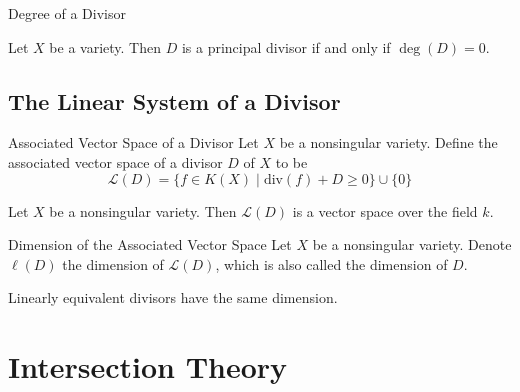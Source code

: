 \documentclass[a4paper]{article}
\begin{document}
\begin{defn}{Degree of a Divisor}{}
\end{defn}

\begin{prp}{}{} Let $X$ be a variety. Then $D$ is a principal divisor if and only if $\deg(D)=0$. 
\end{prp}

\subsection{The Linear System of a Divisor}
\begin{defn}{Associated Vector Space of a Divisor}{} Let $X$ be a nonsingular variety. Define the associated vector space of a divisor $D$ of $X$ to be $$\mathcal{L}(D)=\{f\in K(X)\;|\;\text{div}(f)+D\geq 0\}\cup\{0\}$$
\end{defn}

\begin{lmm}{}{} Let $X$ be a nonsingular variety. Then $\mathcal{L}(D)$ is a vector space over the field $k$. 
\end{lmm}

\begin{defn}{Dimension of the Associated Vector Space}{} Let $X$ be a nonsingular variety. Denote $\ell(D)$ the dimension of $\mathcal{L}(D)$, which is also called the dimension of $D$. 
\end{defn}

\begin{thm}{}{} Linearly equivalent divisors have the same dimension. 
\end{thm}

\pagebreak
\section{Intersection Theory}
\end{document}
